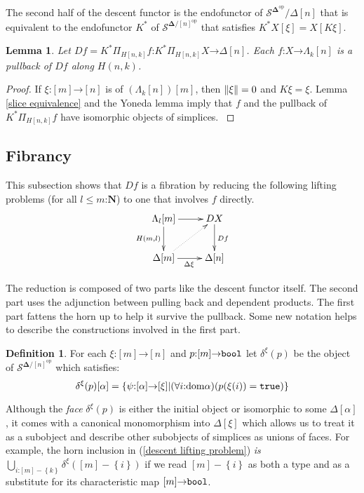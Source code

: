 \documentclass{amsart}
\theoremstyle{plain}
\newtheorem{lemma}[theorem]{Lemma}
\theoremstyle{definition}
\newtheorem{defin}[theorem]{Definition}
\newcommand\cat\mathcal
\newcommand\set[1]{\left\{#1\right\}}
\newcommand\dom{\mathrm{dom}}
\newcommand\ri{^*}
\newcommand\nno{\mathbf N}
\newcommand\dual{^{\mathrm{op}}}
\newcommand\simCat{\mathbf\Delta}
\newcommand\s{^{\simCat\dual}}
\newcommand\of{\mathord:}
\renewcommand\to{\mathord\rightarrow}
\newcommand\simplex\Delta
\newcommand\horn\Lambda
\begin{document}
The second half of the descent functor is the endofunctor of $\cat S\s/\simplex[n]$ that is equivalent to the endofunctor $K\ri$ of $\cat S^{\simCat/[n]\dual}$ that satisfies $K\ri X[\xi] = X[K\xi]$.

\newcommand\depprod[1]{\Pi_{#1}}
\newcommand\depsum[1]{\Sigma_{#1}}
\begin{lemma} Let $Df = K\ri\depprod{H[n,k]}f\of K\ri\depprod{H[n,k]}X\to\simplex[n]$. Each $f\of X\to\horn_k[n]$ is a pullback of $Df$ along $H(n,k)$. \end{lemma}

\begin{proof} If $\xi\of [m]\to[n]$ is of $(\horn_k[n])[m]$, then $\Vert \xi \Vert=0$ and $K\xi = \xi$. Lemma \ref{slice equivalence} and the Yoneda lemma imply that $f$ and the pullback of $K\ri\depprod{H[n,k]}f$ have isomorphic objects of simplices. \label{descent pullback}
\end{proof}

\subsection{Fibrancy}
This subsection shows that $Df$ is a fibration by reducing the following lifting problems (for all $l\leq m\of\nno$) to one that involves $f$ directly.
\begin{equation}
	\xymatrix{
		\horn_l[m]\ar[r]\ar[d]_{H(m,l)} & DX\ar[d]^{Df} \\
		\simplex[m]\ar[r]_{\Delta\xi} \ar@{.>}[ur] & \simplex[n]
	}
	\label{descent lifting problem}
\end{equation}

The reduction is composed of two parts like the descent functor itself. The second part uses the adjunction between pulling back and dependent products. The first part fattens the horn up to help it survive the pullback. Some new notation helps to describe the constructions involved in the first part.

\newcommand\face\delta
\begin{defin} For each $\xi\of[m]\to[n]$ and $p\of[m]\to\bool$ let $\face^\xi(p)$ be the object of $\cat S^{\simCat/[n]\dual}$ which satisfies: 
\[ \face^\xi(p)[\alpha] = \set{\psi\of [\alpha]\to[\xi] | (\forall i\of \dom\alpha)(p(\xi(i))=\true)} \]
\end{defin}

Although the \emph{face} $\face^\xi(p)$ is either the initial object or isomorphic to some $\simplex[\alpha]$, it comes with a canonical monomorphism into $\simplex[\xi]$ which allows us to treat it as a subobject and describe other subobjects of simplices as unions of faces. For example, the horn inclusion in (\ref{descent lifting problem}) \emph{is} $\bigcup_{i\of [m]-\set k} \face^\xi([m]-\set i)$ if we read $[m]-\set i$ as both a type and as a substitute for its characteristic map $[m]\to\bool$.
\end{document}
